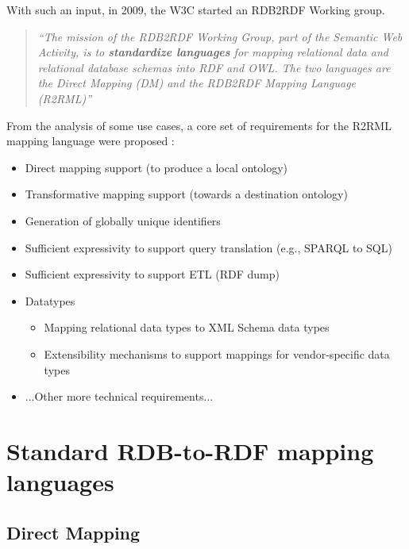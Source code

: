 \documentclass[11pt]{llncs}
\newcommand{\labelsec}[1]{\label{sec:#1}}
\begin{document}
With such an input, in 2009, the W3C started an RDB2RDF Working group.

\begin{quote}
 \textit{``The mission of the RDB2RDF Working Group, part of the Semantic Web Activity, 
 is to \textbf{standardize languages} for mapping relational data and relational database schemas into RDF and OWL. 
 The two languages are the Direct Mapping (DM) and the RDB2RDF Mapping Language (R2RML)''}
\end{quote}

From the analysis of some use cases, a core set of requirements for the R2RML mapping language were proposed \cite{W3UCMapping}:
\begin{itemize}
 \item Direct mapping support (to produce a local ontology)
 \item Transformative mapping support (towards a destination ontology)
 \item Generation of globally unique identifiers
 \item Sufficient expressivity to support query translation (e.g., SPARQL to SQL)
 \item Sufficient expressivity to support ETL (RDF dump)
 \item Datatypes
    \begin{itemize}
     \item Mapping relational data types to XML Schema data types
     \item Extensibility mechanisms to support mappings for vendor-specific data types
    \end{itemize}
 \item ...Other more technical requirements...

\end{itemize}



\section{Standard RDB-to-RDF mapping languages}
\labelsec{stdmapping}

\subsection{Direct Mapping}
\labelsec{directMapping}
\end{document}
